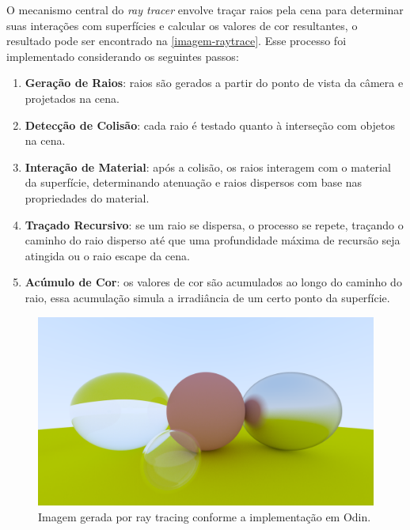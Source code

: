 \documentclass[english, 
               brazil, 
               bsc] %
               {dcomp-abntex2}
\begin{document}
O mecanismo central do \textit{ray tracer} envolve traçar raios pela cena para determinar suas interações com superfícies e calcular os valores de cor resultantes, o resultado pode ser encontrado na \autoref{imagem-raytrace}. Esse processo foi implementado considerando os seguintes passos:


\begin{enumerate}
\item \textbf{Geração de Raios}: raios são gerados a partir do ponto de vista da câmera e projetados na cena.
\item \textbf{Detecção de Colisão}: cada raio é testado quanto à interseção com objetos na cena.
\item \textbf{Interação de Material}: após a colisão, os raios interagem com o material da superfície, determinando atenuação e raios dispersos com base nas propriedades do material.
\item \textbf{Traçado Recursivo}: se um raio se dispersa, o processo se repete, traçando o caminho do raio disperso até que uma profundidade máxima de recursão seja atingida ou o raio escape da cena.
\item \textbf{Acúmulo de Cor}: os valores de cor são acumulados ao longo do caminho do raio, essa acumulação simula a irradiância de um certo ponto da superfície.


\end{enumerate}


\begin{landscape}
\begin{figure}[H]
        \caption{\label{imagem-raytrace} \small Imagem gerada por ray tracing conforme a implementação em Odin.}
        \begin{center}
            \includegraphics[scale=0.50]{./Imagens/ray_tracer.png}
        \end{center}
\end{figure}
\end{landscape}
\end{document}
